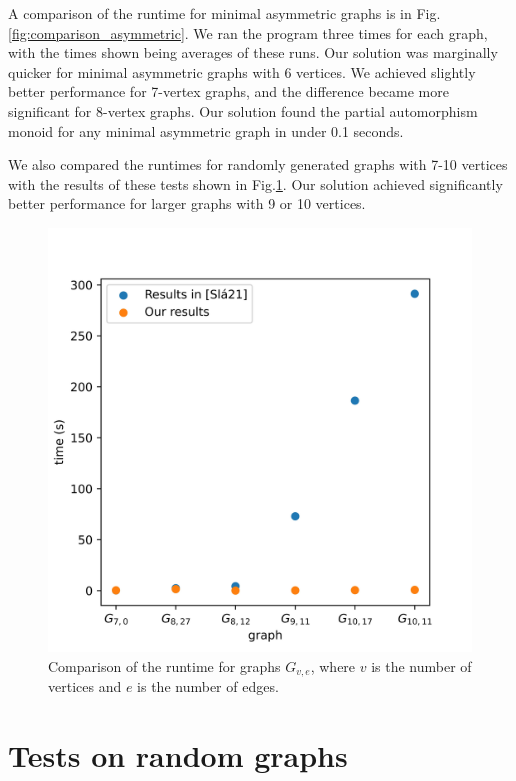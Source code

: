 A comparison of the runtime for minimal asymmetric graphs is in Fig. \ref{fig:comparison_asymmetric}. We ran the program three times for each graph, with the times shown being averages of these runs. Our solution was marginally quicker for minimal asymmetric graphs with 6 vertices. We achieved slightly better performance for 7-vertex graphs, and the difference became more significant for 8-vertex graphs. Our solution found the partial automorphism monoid for any minimal asymmetric graph in under 0.1 seconds.

We also compared the runtimes for randomly generated graphs with 7-10 vertices with the results of these tests shown in Fig.\ref{fig:comparison_random}. Our solution achieved significantly better performance for larger graphs with 9 or 10 vertices.

\begin{figure}[H]
\centering
\includegraphics[scale=0.8,keepaspectratio]{images/comparison_random_slavik.jpg}
\caption{Comparison of the runtime for graphs $G_{v,e}$, where $v$ is the number of vertices and $e$ is the number of edges.}
\label{fig:comparison_random}
\end{figure}

\section{Tests on random graphs}
\label{sec:random_tests}

